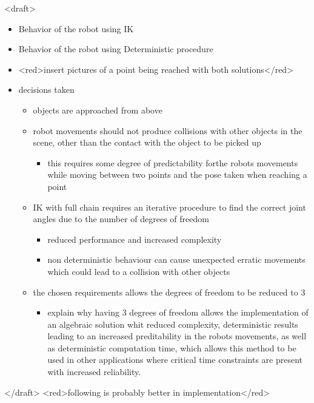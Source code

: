 <draft>

\begin{itemize}
    \item Behavior of the robot using IK
    \item Behavior of the robot using Deterministic procedure
    \item <red>insert pictures of a point being reached with both solutions</red>
    
    \item decisions taken
    \begin{itemize}
      \item objects are approached from above
      \item robot movements should not produce collisions with other objects in the scene, other than the contact with the object to be picked up
      \begin{itemize}
        \item this requires some degree of predictability forthe robots movements while moving between two points and the pose taken when reaching a point
      \end{itemize}
      \item IK with full chain requires an iterative procedure to find the correct joint angles due to the number of degrees of freedom
      \begin{itemize}
        \item reduced performance and increased complexity
        \item non deterministic behaviour can cause unexpected erratic movements which could lead to a collision with other objects
      \end{itemize}
      \item the chosen requirements allows the  degrees of freedom to be reduced to 3
      \begin{itemize}
        \item explain why having 3 degrees of freedom allows the implementation of an algebraic solution whit reduced complexity, deterministic results leading to an increased preditability in the robots movements, as well as deterministic computation time, which allows this method to be used in other applications where critical time constraints are present with increased reliability.
      \end{itemize}
    \end{itemize}
\end{itemize}

</draft>
<red>following is probably better in implementation</red>  

